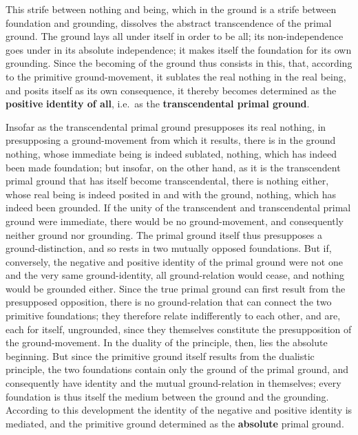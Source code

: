 \documentclass[12pt,a4paper,openany]{book}
\newcommand{\opage}[1]{\marginnote{\footnotesize\textit{[#1]}}}
\begin{document}
This strife between nothing and being, which in the ground
is a strife between foundation and grounding, dissolves
the abstract transcendence of the primal ground. The ground
lays all under itself in order to be all; its non-independence
goes under in its absolute independence; it
makes itself the foundation for its own grounding.
Since the becoming of the ground thus consists in this, that,
according to the primitive ground-movement, it sublates the real nothing
in the real being, and posits itself as its own
consequence, it thereby becomes determined as the \textbf{positive}
\setcounter{footnote}{0}%
\opage{130}\textbf{identity of all}, i.e.\ as the \textbf{transcendental
primal ground}.

Insofar as the transcendental primal ground presupposes
its real nothing, in presupposing a ground-movement from which it results, there is in the ground nothing, whose
immediate being is indeed sublated, nothing, which has indeed been
made foundation; but insofar, on the other hand, as it is the
transcendent primal ground that has itself become transcendental,
there is nothing either, whose real being is indeed posited in
and with the ground, nothing, which has indeed been grounded.
If the unity of the transcendent and transcendental
primal ground were immediate, there would be no ground-movement,
and consequently neither ground nor grounding.
The primal ground itself thus presupposes a ground-distinction, and
so rests in two mutually opposed foundations.
But if, conversely, the negative and positive identity of the primal ground
were not one and the very same ground-identity,
all ground-relation would cease, and nothing would be
grounded either. Since the true primal ground can first result
from the presupposed opposition, there is no
ground-relation that can connect the two primitive
foundations; they therefore relate indifferently to each other,
and are, each for itself, ungrounded, since they themselves
constitute the presupposition of the ground-movement. In the duality of the
principle, then, lies the absolute beginning.
But since the primitive ground itself results from the
dualistic principle, the two foundations contain only
the ground of the primal ground, and consequently have identity and the
mutual ground-relation in themselves; every foundation is thus
itself the medium between the ground and the grounding.
According to this development the identity of the negative
and positive identity is mediated, and the primitive ground
determined as the \textbf{absolute} primal ground.
\setcounter{footnote}{0}%
\end{document}
